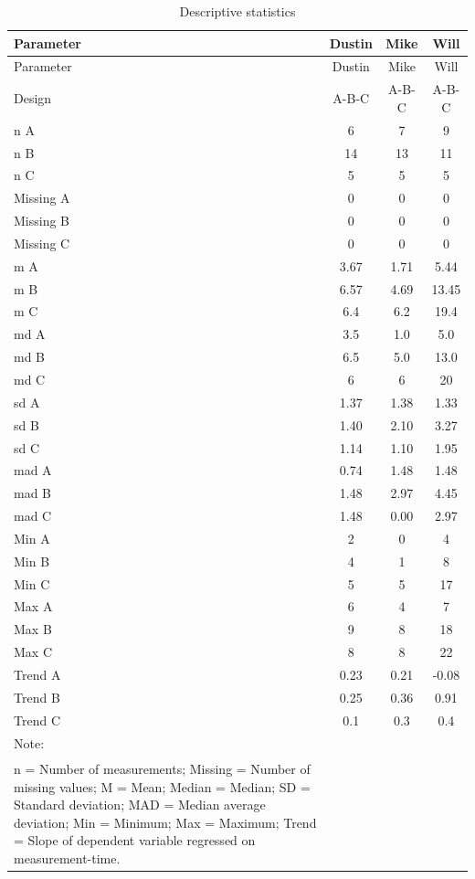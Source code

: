 \documentclass[
  letterpaper,
  DIV=11,
  numbers=noendperiod]{scrreprt}
\begin{document}
\begin{longtable}[]{@{}lccc@{}}
\caption{Descriptive statistics}\tabularnewline
\toprule()
Parameter & Dustin & Mike & Will \\
\midrule()
\endfirsthead
\toprule()
Parameter & Dustin & Mike & Will \\
\midrule()
\endhead
Design & A-B-C & A-B-C & A-B-C \\
n A & 6 & 7 & 9 \\
n B & 14 & 13 & 11 \\
n C & 5 & 5 & 5 \\
Missing A & 0 & 0 & 0 \\
Missing B & 0 & 0 & 0 \\
Missing C & 0 & 0 & 0 \\
m A & 3.67 & 1.71 & 5.44 \\
m B & 6.57 & 4.69 & 13.45 \\
m C & 6.4 & 6.2 & 19.4 \\
md A & 3.5 & 1.0 & 5.0 \\
md B & 6.5 & 5.0 & 13.0 \\
md C & 6 & 6 & 20 \\
sd A & 1.37 & 1.38 & 1.33 \\
sd B & 1.40 & 2.10 & 3.27 \\
sd C & 1.14 & 1.10 & 1.95 \\
mad A & 0.74 & 1.48 & 1.48 \\
mad B & 1.48 & 2.97 & 4.45 \\
mad C & 1.48 & 0.00 & 2.97 \\
Min A & 2 & 0 & 4 \\
Min B & 4 & 1 & 8 \\
Min C & 5 & 5 & 17 \\
Max A & 6 & 4 & 7 \\
Max B & 9 & 8 & 18 \\
Max C & 8 & 8 & 22 \\
Trend A & 0.23 & 0.21 & -0.08 \\
Trend B & 0.25 & 0.36 & 0.91 \\
Trend C & 0.1 & 0.3 & 0.4 \\
{Note: } & & & \\
\textsuperscript{} n = Number of measurements; Missing = Number of
missing values; M = Mean; Median = Median; SD = Standard deviation; MAD
= Median average deviation; Min = Minimum; Max = Maximum; Trend = Slope
of dependent variable regressed on measurement-time. & & & \\
\bottomrule()
\end{longtable}
\end{document}
